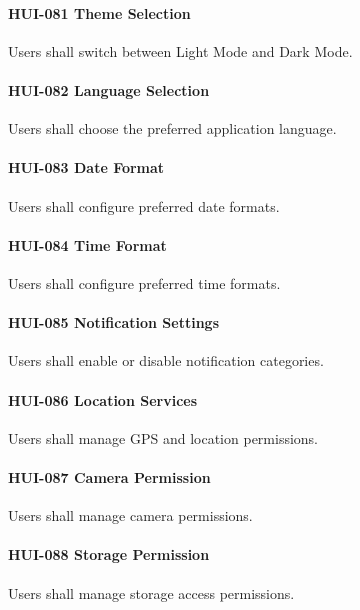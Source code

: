 \paragraph{HUI-081 Theme Selection}

Users shall switch between Light Mode and Dark Mode.

\paragraph{HUI-082 Language Selection}

Users shall choose the preferred application language.

\paragraph{HUI-083 Date Format}

Users shall configure preferred date formats.

\paragraph{HUI-084 Time Format}

Users shall configure preferred time formats.

\paragraph{HUI-085 Notification Settings}

Users shall enable or disable notification categories.

\paragraph{HUI-086 Location Services}

Users shall manage GPS and location permissions.

\paragraph{HUI-087 Camera Permission}

Users shall manage camera permissions.

\paragraph{HUI-088 Storage Permission}

Users shall manage storage access permissions.


